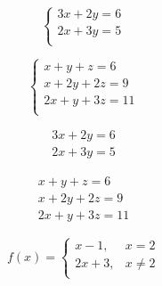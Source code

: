 \documentclass[a4paper, 12pt]{article}
\begin{document}
\vspace{0.5cm}

\begin{equation}
	\left\lbrace
	\begin{array}{cc}
		3x + 2y = 6 \\
		2x + 3y = 5 \\
	\end{array}
	\right.
\end{equation}

\vspace{0.5cm}

\begin{equation}
	\left\lbrace
	\begin{array}{ccc}
		x + y + z = 6\\
		x + 2y + 2z = 9\\
		2x + y + 3z = 11\\
	\end{array}
	\right.
\end{equation}

\vspace{0.5cm}


\begin{eqnarray}
	3x + 2y = 6 \\
	2x + 3y = 5 
\end{eqnarray}

\vspace{0.5cm}

\begin{eqnarray}
	x + y + z = 6 \\
	x + 2y + 2z = 9 \\
	2x + y + 3z = 11
\end{eqnarray}

\vspace{0.5cm}

\begin{equation}
f(x) =
\left\lbrace
\begin{array}{cc}
	x - 1,& x = 2\\
	2x + 3,& x \neq 2\\
\end{array}
\right.
\end{equation}

\vspace{0.5cm}
\end{document}
